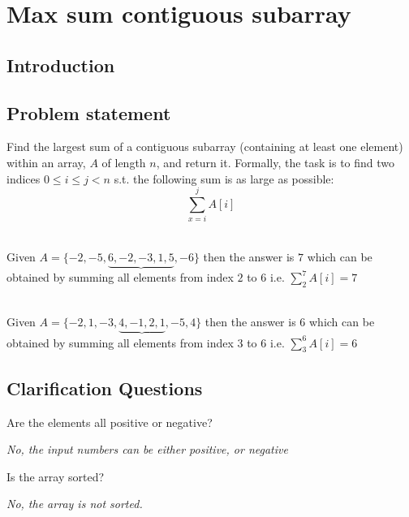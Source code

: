 %

\chapter{Max sum contiguous subarray}
\label{ch:max_sum_continguous_subarray}
\section*{Introduction}

\section{Problem statement}
\begin{exercise}
Find the largest sum of a contiguous subarray (containing at least one element) within an array, $A$ of length $n$, and return it.
Formally, the task is to find two indices $ 0 \leq i \leq j < n$ s.t. the following sum is as large as possible:
\[
\sum_{x=i}^j A[i]
\]

\end{exercise}


\begin{example}
	\hfill \\
	Given $A=\{-2, -5, \underbrace{6, -2, -3, 1, 5}\text{}, -6\}$ then the answer is $7$ which can be obtained by summing all elements from index $2$ to $6$ i.e. $\sum_{2}^7 A[i] = 7$
\end{example}

\begin{example}
	\hfill \\
	Given $A=\{-2, 1, -3, \underbrace{4, -1, 2, 1}\text{}, -5, 4\}$ then the answer is $6$ which can be obtained by summing all elements from index $3$ to $6$ i.e. $\sum_{3}^6 A[i] = 6$
	
\end{example}

\section{Clarification Questions}

\begin{QandA}
	\item Are the elements all positive or negative?
	\begin{answered}
		\textit{No, the input numbers can be either positive, or negative}
	\end{answered}
	
	\item Is the array sorted?
	\begin{answered}
		\textit{No, the array is not sorted.}
	\end{answered}
	
\end{QandA}

